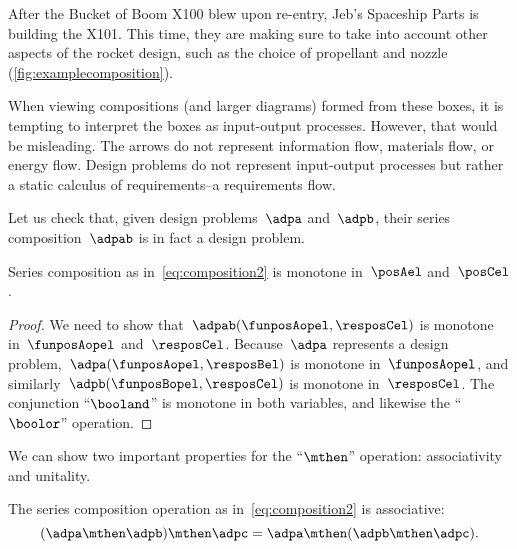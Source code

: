 \begin{example}
    After the Bucket of Boom X100 blew upon re-entry, Jeb's Spaceship Parts is building the X101.
    This time, they are making sure to take into account other aspects of the rocket design, such as the choice of propellant and nozzle (\cref{fig:examplecomposition}).
    \begin{figure*}[h!]
        \centering
        \caption{Example of composition. }
        \label{fig:examplecomposition}
    \end{figure*}
\end{example}

\begin{remark}
    When viewing compositions (and larger diagrams) formed from these boxes, it is tempting to interpret the boxes as input-output processes.
    However, that would be misleading.
    The arrows do not represent information flow, materials flow, or energy flow.
    Design problems do not represent input-output processes but rather a static calculus of requirements--a requirements flow.
\end{remark}

Let us check that, given design problems~$\adpa$ and~$\adpb$, their series composition~$\adpab$ is in fact a design problem.
\begin{lemma}
    Series composition as in~\cref{eq:composition2} is monotone in~$\posAel$ and~$\posCel$.
\end{lemma}
\begin{proof}
    We need to show that~$\adpab(\funposAopel,\resposCel)$ is monotone in~$\funposAopel$ and~$\resposCel$.
    Because~$\adpa$ represents a design problem,~$\adpa(\funposAopel,\resposBel)$ is monotone in~$\funposAopel$, and similarly~$\adpb(\funposBopel,\resposCel)$ is monotone in~$\resposCel$.
    The conjunction ``$\booland$'' is monotone in both variables, and likewise the ``$\boolor$'' operation.
\end{proof}

We can show two important properties for the ``$\mthen$'' operation: associativity and unitality.
\begin{lemma}
    The series composition operation as in~\cref{eq:composition2} is associative:
    \begin{equation}
        (\adpa\mthen \adpb)
        \mthen \adpc = \adpa\mthen (\adpb\mthen \adpc).
    \end{equation}
\end{lemma}

